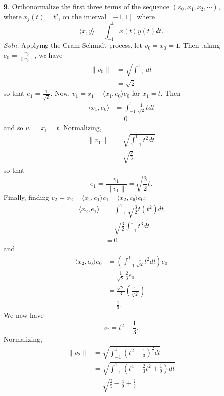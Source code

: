 \documentclass{article}
\begin{document}
\begin{itemize}
    \item[\textbf{9}.] Orthonormalize the first three terms of the sequence $(x_0, x_1, x_2, \cdots)$, where $x_j(t) = t^j$, on the interval $[-1, 1]$, where
    \[\langle x, y\rangle = \int_{-1}^1 x(t)y(t)dt.\]
    \textit{Soln.} Applying the Gram-Schmidt process, let $v_0 = x_0 = 1$. Then taking $e_0 = \frac{v_0}{\|v_0\|}$, we have
    \begin{align*}
        \|v_0\| &= \sqrt{\int_{-1}^1 dt}\\
        &= \sqrt{2}
    \end{align*}
    so that $e_1 = \frac{1}{\sqrt{2}}$. Now, $v_1 = x_1 - \langle x_1, e_0\rangle e_0$ for $x_1 = t$. Then
    \begin{align*}
        \langle x_1, e_0\rangle &= \int_{-1}^1 \frac{1}{\sqrt{2}}tdt\\
        &= 0
    \end{align*}
    and so $v_1 = x_1 = t$. Normalizing,
    \begin{align*}
        \|v_1\| &= \sqrt{\int_{-1}^1 t^2dt}\\
        &= \sqrt{\frac{2}{3}}
    \end{align*}
    so that
    \[e_1 = \frac{v_1}{\|v_1\|} = \sqrt{\frac{3}{2}} t.\]
    Finally, finding $v_2 = x_2 - \langle x_2, e_1\rangle e_1 - \langle x_2, e_0\rangle e_0$:
    \begin{align*}
        \langle x_2, e_1\rangle &= \int_{-1}^{1} \sqrt{\frac{3}{2}}t (t^2)dt\\
        &= \sqrt{\frac{3}{2}}\int_{-1}^1 t^3 dt\\
        &= 0
    \end{align*}
    and
    \begin{align*}
        \langle x_2, e_0 \rangle e_0 &= \left(\int_{-1}^1 \frac{1}{\sqrt{2}} t^2dt \right)e_0\\
        &= \frac{1}{\sqrt{2}}\frac{2}{3}e_0\\
        &= \frac{\sqrt{2}}{3}\left(\frac{1}{\sqrt{2}}\right)\\
        &= \frac{1}{3}.
    \end{align*}
    We now have
    \[v_2 = t^2 - \frac{1}{3}.\]
    Normalizing,
    \begin{align*}
        \|v_2\| &= \sqrt{\int_{-1}^1\left(t^2 - \frac{1}{3}\right)^2dt}\\
        &= \sqrt{\int_{-1}^1\left(t^4 - \frac{2}{3}t^2 + \frac{1}{9}\right)dt}\\
        &= \sqrt{\frac{2}{5} - \frac{4}{9} + \frac{2}{9}}\\

\end{align*}
\end{itemize}
\end{document}
